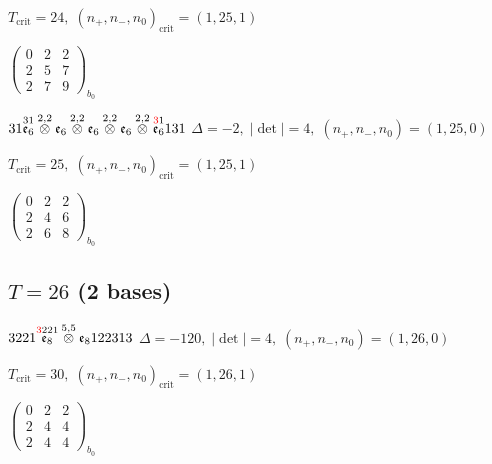 \documentclass[10pt]{article}
\begin{document}
\hspace{1em}$T_{\text{crit}}=24,\; (n_+,n_-,n_0)_{\text{crit}}=(1,25,1)$

\hspace{2em}$\left(\begin{smallmatrix}0 & 2 & 2 \\ 2 & 5 & 7 \\ 2 & 7 & 9\end{smallmatrix}\right)_{\!b_0}$

$31\overset{31}{\mathfrak{e}_6}\overset{2,2}{\otimes}\mathfrak{e}_6\overset{2,2}{\otimes}\mathfrak{e}_6\overset{2,2}{\otimes}\mathfrak{e}_6\overset{2,2}{\otimes}\overset{\textcolor{red}{3}1}{\mathfrak{e}_6}131$ \quad $\Delta=-2,\; |\det|=4,\; (n_+,n_-,n_0)=(1,25,0)$

\hspace{1em}$T_{\text{crit}}=25,\; (n_+,n_-,n_0)_{\text{crit}}=(1,25,1)$

\hspace{2em}$\left(\begin{smallmatrix}0 & 2 & 2 \\ 2 & 4 & 6 \\ 2 & 6 & 8\end{smallmatrix}\right)_{\!b_0}$


\subsection*{$T = 26$ \quad (2 bases)}
\smallskip

$3221\overset{\textcolor{red}{3}221}{\mathfrak{e}_8}\overset{5,5}{\otimes}\mathfrak{e}_8122313$ \quad $\Delta=-120,\; |\det|=4,\; (n_+,n_-,n_0)=(1,26,0)$

\hspace{1em}$T_{\text{crit}}=30,\; (n_+,n_-,n_0)_{\text{crit}}=(1,26,1)$

\hspace{2em}$\left(\begin{smallmatrix}0 & 2 & 2 \\ 2 & 4 & 4 \\ 2 & 4 & 4\end{smallmatrix}\right)_{\!b_0}$

\smallskip
\end{document}
